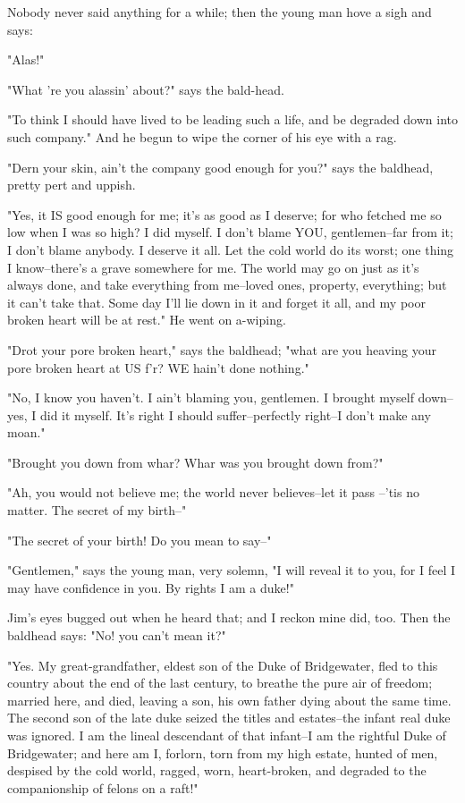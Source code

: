 Nobody never said anything for a while; then the young man hove a sigh
and says:

"Alas!"

"What 're you alassin' about?" says the bald-head.

"To think I should have lived to be leading such a life, and be degraded
down into such company."  And he begun to wipe the corner of his eye with
a rag.

"Dern your skin, ain't the company good enough for you?" says the
baldhead, pretty pert and uppish.

"Yes, it IS good enough for me; it's as good as I deserve; for who
fetched me so low when I was so high?  I did myself.  I don't blame YOU,
gentlemen--far from it; I don't blame anybody.  I deserve it all.  Let
the cold world do its worst; one thing I know--there's a grave somewhere
for me. The world may go on just as it's always done, and take everything
from me--loved ones, property, everything; but it can't take that.
Some day I'll lie down in it and forget it all, and my poor broken heart
will be at rest."  He went on a-wiping.

"Drot your pore broken heart," says the baldhead; "what are you heaving
your pore broken heart at US f'r?  WE hain't done nothing."

"No, I know you haven't.  I ain't blaming you, gentlemen.  I brought
myself down--yes, I did it myself.  It's right I should suffer--perfectly
right--I don't make any moan."

"Brought you down from whar?  Whar was you brought down from?"

"Ah, you would not believe me; the world never believes--let it pass
--'tis no matter.  The secret of my birth--"

"The secret of your birth!  Do you mean to say--"

"Gentlemen," says the young man, very solemn, "I will reveal it to you,
for I feel I may have confidence in you.  By rights I am a duke!"

Jim's eyes bugged out when he heard that; and I reckon mine did, too.
Then the baldhead says:  "No! you can't mean it?"

"Yes.  My great-grandfather, eldest son of the Duke of Bridgewater, fled
to this country about the end of the last century, to breathe the pure
air of freedom; married here, and died, leaving a son, his own father
dying about the same time.  The second son of the late duke seized the
titles and estates--the infant real duke was ignored.  I am the lineal
descendant of that infant--I am the rightful Duke of Bridgewater; and
here am I, forlorn, torn from my high estate, hunted of men, despised by
the cold world, ragged, worn, heart-broken, and degraded to the
companionship of felons on a raft!"

